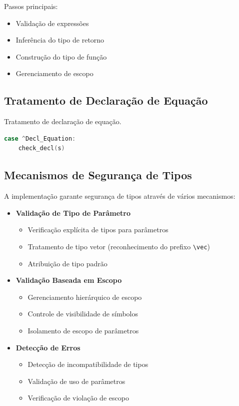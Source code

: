 Passos principais:
\begin{itemize}
    \item Validação de expressões
    \item Inferência do tipo de retorno
    \item Construção do tipo de função
    \item Gerenciamento de escopo
\end{itemize}

\subsection{Tratamento de Declaração de Equação}
\begin{codigo}[htb]
    \caption{\small Tratamento de declaração de equação.}
    \label{cod-equation-declaration}
\begin{lstlisting}[language=C, numbers=none, frame=none, inputencoding=latin1]
case ^Decl_Equation:
    check_decl(s)
\end{lstlisting}
\end{codigo}

\subsection{Mecanismos de Segurança de Tipos}
A implementação garante segurança de tipos através de vários mecanismos:

\begin{itemize}
    \item \textbf{Validação de Tipo de Parâmetro}
    \begin{itemize}
        \item Verificação explícita de tipos para parâmetros
        \item Tratamento de tipo vetor (reconhecimento do prefixo \verb|\vec|)
        \item Atribuição de tipo padrão
    \end{itemize}

    \item \textbf{Validação Baseada em Escopo}
    \begin{itemize}
        \item Gerenciamento hierárquico de escopo
        \item Controle de visibilidade de símbolos
        \item Isolamento de escopo de parâmetros
    \end{itemize}

    \item \textbf{Detecção de Erros}
    \begin{itemize}
        \item Detecção de incompatibilidade de tipos
        \item Validação de uso de parâmetros
        \item Verificação de violação de escopo
    \end{itemize}
\end{itemize}

